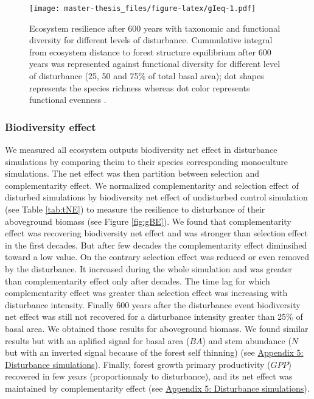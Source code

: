 \documentclass[12pt,]{article}
\theoremstyle{definition}
\theoremstyle{definition}
\theoremstyle{remark}
\begin{document}
\begin{figure}[htbp]
\centering
\texttt{[image: master-thesis\_files/figure-latex/gIeq-1.pdf]}
\caption{\label{fig:gIeq}Ecosystem resilience after 600 years with taxonomic
and functional diversity for different levels of disturbance.
Cummulative integral from ecosystem distance to forest structure
equilibrium after 600 years was represented against functional diversity
\citep[FDiv,][]{villeger_new_2008} for different level of disturbance
(25, 50 and 75\% of total basal area); dot shapes represents the species
richness whereas dot color represents functional evenness
\citep[FEve,][]{villeger_new_2008}.}
\end{figure}

\subsubsection{Biodiversity effect}\label{biodiversity-effect-1}

We measured all ecosystem outputs biodiversity net effect in disturbance
simulations by comparing theim to their species corresponding
monoculture simulations. The net effect was then partition between
selection and complementarity effect. We normalized complementarity and
selection effect of disturbed simulations by biodiversity net effect of
undisturbed control simulation (see Table \ref{tab:tNE}) to measure the
resilience to disturbance of their aboveground biomass (see Figure
\ref{fig:gBE}). We found that complementarity effect was recovering
biodiversity net effect and was stronger than selection effect in the
first decades. But after few decades the complementarity effect
diminsihed toward a low value. On the contrary selection effect was
reduced or even removed by the disturbance. It increased during the
whole simulation and was greater than complementarity effect only after
decades. The time lag for which complementarity effect was greater than
selection effect was increasing with disturbance intensity. Finally 600
years after the disturbance event biodiversity net effect was still not
recovered for a disturbance intensity greater than 25\% of basal area.
We obtained those results for aboveground biomass. We found similar
results but with an aplified signal for basal area (\(BA\)) and stem
abundance (\(N\) but with an inverted signal because of the forest self
thinning) (see
\protect\hyperlink{appendix-5-disturbance-simulations}{Appendix 5:
Disturbance simulations}). Finally, forest growth primary productivity
(\(GPP\)) recovered in few years (proportionnaly to disturbance), and
its net effect was maintained by complementarity effect (see
\protect\hyperlink{appendix-5-disturbance-simulations}{Appendix 5:
Disturbance simulations}).
\end{document}

